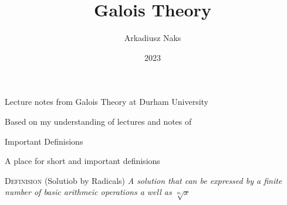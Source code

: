 \documentclass[12pt, letterpaper]{article}
\title{Galois Theory}
\author{Arkadiusz Naks}
\date{2023}
\begin{document}
\begin{titlepage}
  \begin{center}
    \makeatletter
    \vspace*{1cm}
    \Huge
    \textbf{\@title}

    \vspace{0.5cm}
    \Large
    Lecture notes from Galois Theory at Durham University

    \vspace{1.5cm}

    \textbf{\@author}

    \vfill

    \vspace{0.8cm}

    \small
    Based on my understanding of lectures and notes of \\
    \@date{}
  \end{center}
\end{titlepage}

\tableofcontents
\newpage

\begin{section}{Important Definisions}

  A place for short and important definisions

  \textsc{Definision} (Solutiob by Radicals) \textit{A solution that can be
    expressed by a finite number of basic arithmeic operations a well as
    \(\sqrt[m]{x}\)}

\end{section}
\end{document}
